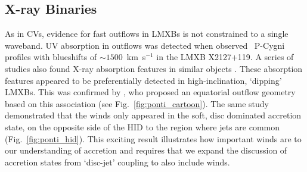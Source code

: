 

\subsection{X-ray Binaries}
\label{sec:xrb_winds}

As in CVs, evidence for fast outflows in LMXBs is not constrained to 
a single waveband. UV absorption in outflows was detected when
\cite{ioannau2003} observed \civfull\ P-Cygni profiles with blueshifts 
of $\sim1500$~km~s$^{-1}$ in the LMXB X2127+119. 
A series of studies also found X-ray absorption features in similar objects 
\citep{ueda1998,kotani2000,parmar2002}. 
These absorption features appeared to be preferentially detected
in high-inclination, `dipping' LMXBs. This was confirmed
by \cite{ponti2012}, who proposed an equatorial outflow 
geometry based on this association (see Fig.~\ref{fig:ponti_cartoon}). 
The same study demonstrated that
the winds only appeared in the soft, 
disc dominated accretion state, on the opposite side of the HID to the
region where jets are common (Fig.~\ref{fig:ponti_hid}). 
This exciting result illustrates how
important winds are to our understanding of accretion and requires that
we expand the discussion of accretion states from `disc-jet' coupling
to also include winds.

